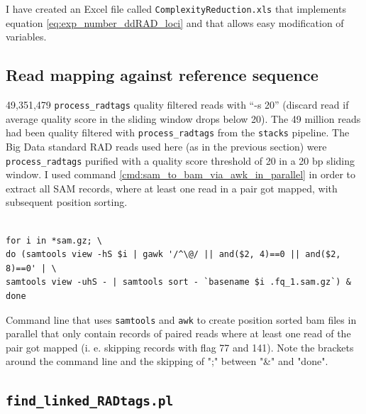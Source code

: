 \documentclass[a4paper,12pt,times,print,index, custombib]{PhDThesisPSnPDF}\usepackage[]{graphicx}\usepackage[]{color}
\begin{document}
I have created an Excel file called \texttt{ComplexityReduction.xls} that implements equation \ref{eq:exp_number_ddRAD_loci} and that allows easy modification of variables.


\FloatBarrier
\subsection{Read mapping against reference sequence}\label{ch:read_mapping}

49,351,479 \texttt{process\_radtags} quality filtered reads with ``-s 20'' (discard read if average quality score in the sliding window drops below 20). The 49 million reads had been quality filtered with \texttt{process\_radtags} from the \texttt{stacks} pipeline. The Big Data standard RAD reads used here (as in the previous section) were \texttt{process\_radtags} purified with a quality score threshold of 20 in a 20 bp sliding window. I used command \ref{cmd:sam_to_bam_via_awk_in_parallel} in order to extract all SAM records, where at least one read in a pair got mapped, with subsequent position sorting.

\begin{cmd}
\captionsetup{type=cmd} %
\begin{Verbatim}[fontsize=\scriptsize, formatcom=\color{darkgray}]

for i in *sam.gz; \
do (samtools view -hS $i | gawk '/^\@/ || and($2, 4)==0 || and($2, 8)==0' | \
samtools view -uhS - | samtools sort - `basename $i .fq_1.sam.gz`) & done
\end{Verbatim}
\caption{Command line that uses \texttt{samtools} and \texttt{awk} to create position sorted bam files in parallel that only contain records of paired reads where at least one read of the pair got mapped (i. e. skipping records with flag 77 and 141). \scriptsize{Note the brackets around the command line and the skipping of ";" between "\&" and "done"}. }
\label{cmd:sam_to_bam_via_awk_in_parallel}
\end{cmd}

\FloatBarrier
\subsection{\texttt{find\_linked\_RADtags.pl}}\label{ch:find_linked_RADtags}
\end{document}
